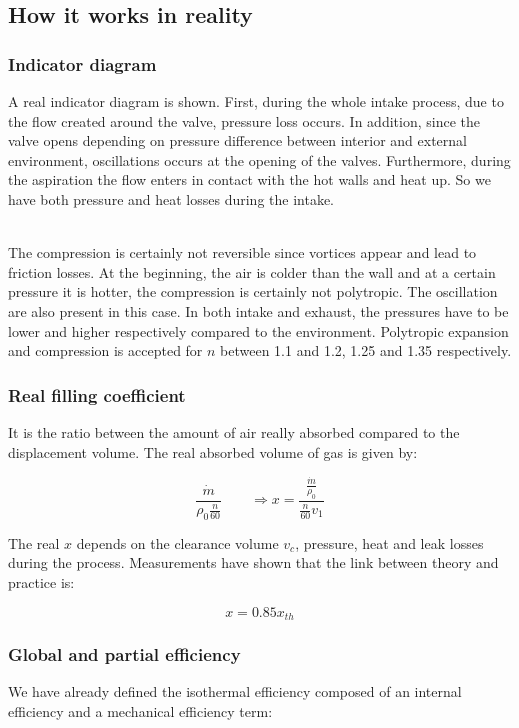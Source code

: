 \subsection{How it works in reality}
\subsubsection{Indicator diagram}

A real indicator diagram is shown. First, during the whole intake process, due to the flow created around the valve, pressure loss occurs. In addition, since the valve opens depending on pressure difference between interior and external environment, oscillations occurs at the opening of the valves. Furthermore, during the aspiration the flow enters in contact with the hot walls and heat up. So we have both pressure and heat losses during the intake. 

\ \\
The compression is certainly not reversible since vortices appear and lead to friction losses. At the beginning, the air is colder than the wall and at a certain pressure it is hotter, the compression is certainly not polytropic. The oscillation are also present in this case. In both intake and exhaust, the pressures have to be lower and higher respectively compared to the environment. Polytropic expansion and compression is accepted for $n$ between 1.1 and 1.2, 1.25 and 1.35 respectively. 

\subsubsection{Real filling coefficient}
It is the ratio between the amount of air really absorbed compared to the displacement volume. The real absorbed volume of gas is given by: 

\begin{equation}
\frac{\dot{m}}{\rho _0 \frac{n}{60}} \qquad \Rightarrow x = \frac{\frac{\dot{m}}{\rho_0}}{\frac{n}{60}v_1}
\end{equation} 	

The real $x$ depends on the clearance volume $v_c$, pressure, heat and leak losses during the process. Measurements have shown that the link between theory and practice is: 

\begin{equation}
x = 0.85 x_{th}
\end{equation}

\subsubsection{Global and partial efficiency}
We have already defined the isothermal efficiency composed of an internal efficiency and a mechanical efficiency term: 

